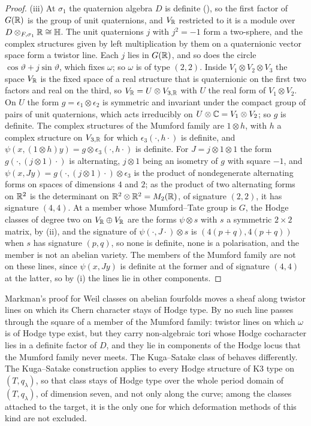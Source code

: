 \begin{proof}
(iii) At $\sigma_{1}$ the quaternion algebra $D$ is definite
(), so the first factor of $G(\mathbb{R})$ is the group of unit
quaternions, and $V_{\mathbb{R}}$ restricted to it is a module over
$D\otimes_{F,\sigma_{1}}\mathbb{R}\cong\mathbb{H}$. The unit quaternions $j$ with
$j^{2}=-1$ form a two-sphere, and the complex structures given by left
multiplication by them on a quaternionic vector space form a twistor line.
Each $j$ lies in $G(\mathbb{R})$, and so does the circle $\cos\vartheta+j\sin\vartheta$,
which fixes $\omega$; so $\omega$ is of type $(2,2)$. Inside
$V_{1}\otimes V_{2}\otimes V_{3}$ the space $V_{\mathbb{R}}$ is the fixed space of a
real structure that is quaternionic on the first two factors and real on the
third, so $V_{\mathbb{R}}=U\otimes V_{3,\mathbb{R}}$ with $U$ the real form of
$V_{1}\otimes V_{2}$. On $U$ the form $g=\epsilon_{1}\otimes\epsilon_{2}$ is
symmetric and invariant under the compact group of pairs of unit quaternions,
which acts irreducibly on $U\otimes\mathbb{C}=V_{1}\otimes V_{2}$; so $g$ is
definite. The complex structures of the Mumford family are $1\otimes h$, with
$h$ a complex structure on $V_{3,\mathbb{R}}$ for which $\epsilon_{3}(\cdot,h\cdot)$
is definite, and $\psi(x,(1\otimes h)y)=g\otimes\epsilon_{3}(\cdot,h\cdot)$ is
definite. For $J=j\otimes1\otimes1$ the form $g(\cdot,(j\otimes1)\cdot)$ is
alternating, $j\otimes1$ being an isometry of $g$ with square $-1$, and
$\psi(x,Jy)=g(\cdot,(j\otimes1)\cdot)\otimes\epsilon_{3}$ is the product of
nondegenerate alternating forms on spaces of dimensions $4$ and $2$; as the
product of two alternating forms on $\mathbb{R}^{2}$ is the determinant on
$\mathbb{R}^{2}\otimes\mathbb{R}^{2}=M_{2}(\mathbb{R})$, of signature $(2,2)$, it has signature
$(4,4)$. At a member whose Mumford--Tate group is $G$, the Hodge
classes of degree two on $V_{\mathbb{R}}\oplus V_{\mathbb{R}}$ are the forms $\psi\otimes s$
with $s$ a symmetric $2\times2$ matrix, by (ii), and
the signature of $\psi(\cdot,J\cdot)\otimes s$ is $(4(p+q),4(p+q))$ when $s$ has
signature $(p,q)$, so none is definite, none is a polarisation, and the member
is not an abelian variety. The members of the Mumford family are not on these
lines, since $\psi(x,Jy)$ is definite at the former and of signature $(4,4)$
at the latter, so by (i) the lines lie in other components.
\end{proof}

Markman's proof for Weil classes on abelian fourfolds moves a sheaf along
twistor lines on which its Chern character stays of Hodge type. By
 no such line passes through the square of a member of
the Mumford family: twistor lines on which $\omega$ is of Hodge type exist,
but they carry non-algebraic tori whose Hodge cocharacter lies in a definite
factor of $D$, and they lie in components of the Hodge locus that the Mumford
family never meets. The Kuga--Satake class of  behaves
differently. The Kuga--Satake construction applies to every Hodge structure
of K3 type on $(T,q_{\lambda})$, so that class stays of Hodge type over the
whole period domain of $(T,q_{\lambda})$, of dimension seven, and not only
along the curve; among the classes attached to the target, it is the only one
for which deformation methods of this kind are not excluded.

